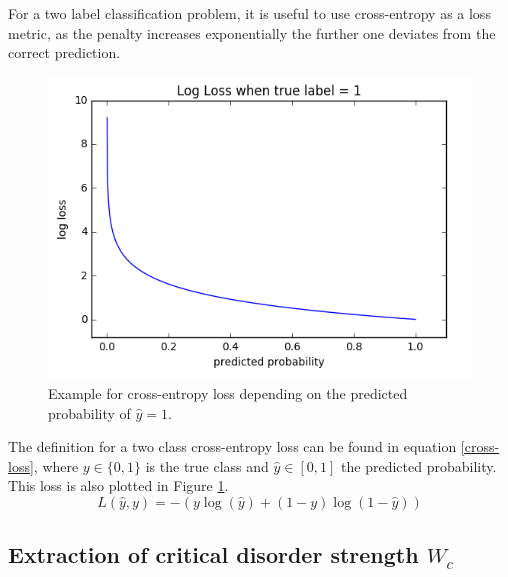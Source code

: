 \documentclass[reprint,amsmath,amssymb,aps,prb]{revtex4-2}
\begin{document}
For a two label classification problem, it is useful to use cross-entropy as a loss metric, as the penalty increases exponentially the further one deviates from the correct prediction.\cite{Goodfellow-et-al-2016}
\begin{figure}[h!]
\centering
\includegraphics[width=\linewidth]{figures/cross_entropy}
\caption{Example for cross-entropy loss depending on the predicted probability of $\hat{y}=1$.}
\label{fig:cross_entropy}
\end{figure}
The definition for a two class cross-entropy loss can be found in equation \ref{cross-loss}, where $y \in \{0,1\}$ is the true class and $\hat{y}\in\left[0,1\right]$ the predicted probability. This loss is also plotted in Figure \ref{fig:cross_entropy}.
\begin{equation}
L(\hat{y}, y)=-\left(y\log(\hat{y})+(1-y)\log(1-\hat{y})\right)\label{cross-loss}
\end{equation}

\subsection{Extraction of critical disorder strength $W_c$}\label{sec:wcextract}
\end{document}

